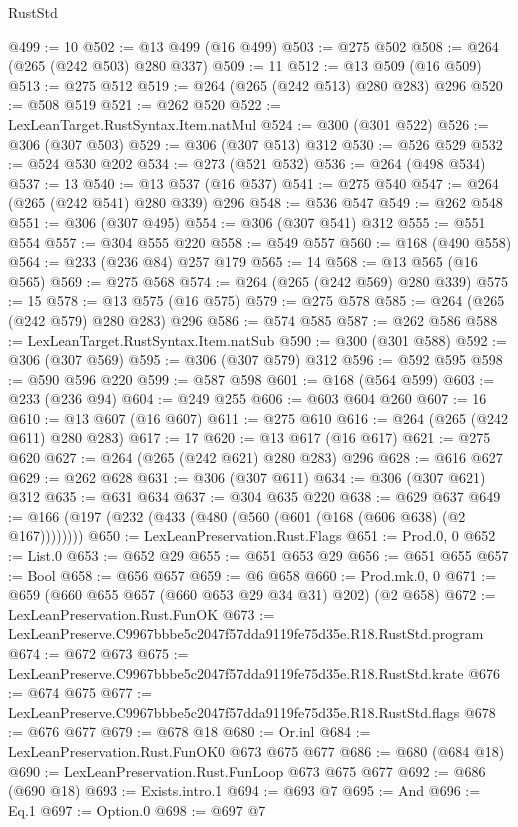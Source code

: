 \begin{lexlean}{RustStd}
\begin{coremodule}
@499 := 10
@502 := @13 @499 (@16 @499)
@503 := @275 @502
@508 := @264 (@265 (@242 @503) @280 @337)
@509 := 11
@512 := @13 @509 (@16 @509)
@513 := @275 @512
@519 := @264 (@265 (@242 @513) @280 @283) @296
@520 := @508 @519
@521 := @262 @520
@522 := LexLeanTarget.RustSyntax.Item.natMul
@524 := @300 (@301 @522)
@526 := @306 (@307 @503)
@529 := @306 (@307 @513) @312
@530 := @526 @529
@532 := @524 @530 @202
@534 := @273 (@521 @532)
@536 := @264 (@498 @534)
@537 := 13
@540 := @13 @537 (@16 @537)
@541 := @275 @540
@547 := @264 (@265 (@242 @541) @280 @339) @296
@548 := @536 @547
@549 := @262 @548
@551 := @306 (@307 @495)
@554 := @306 (@307 @541) @312
@555 := @551 @554
@557 := @304 @555 @220
@558 := @549 @557
@560 := @168 (@490 @558)
@564 := @233 (@236 @84) @257 @179
@565 := 14
@568 := @13 @565 (@16 @565)
@569 := @275 @568
@574 := @264 (@265 (@242 @569) @280 @339)
@575 := 15
@578 := @13 @575 (@16 @575)
@579 := @275 @578
@585 := @264 (@265 (@242 @579) @280 @283) @296
@586 := @574 @585
@587 := @262 @586
@588 := LexLeanTarget.RustSyntax.Item.natSub
@590 := @300 (@301 @588)
@592 := @306 (@307 @569)
@595 := @306 (@307 @579) @312
@596 := @592 @595
@598 := @590 @596 @220
@599 := @587 @598
@601 := @168 (@564 @599)
@603 := @233 (@236 @94)
@604 := @249 @255
@606 := @603 @604 @260
@607 := 16
@610 := @13 @607 (@16 @607)
@611 := @275 @610
@616 := @264 (@265 (@242 @611) @280 @283)
@617 := 17
@620 := @13 @617 (@16 @617)
@621 := @275 @620
@627 := @264 (@265 (@242 @621) @280 @283) @296
@628 := @616 @627
@629 := @262 @628
@631 := @306 (@307 @611)
@634 := @306 (@307 @621) @312
@635 := @631 @634
@637 := @304 @635 @220
@638 := @629 @637
@649 := @166 (@197 (@232 (@433 (@480 (@560 (@601 (@168 (@606 @638) (@2 @167))))))))
@650 := LexLeanPreservation.Rust.Flags
@651 := Prod.{0, 0}
@652 := List.{0}
@653 := @652 @29
@655 := @651 @653 @29
@656 := @651 @655
@657 := Bool
@658 := @656 @657
@659 := @6 @658
@660 := Prod.mk.{0, 0}
@671 := @659 (@660 @655 @657 (@660 @653 @29 @34 @31) @202) (@2 @658)
@672 := LexLeanPreservation.Rust.FunOK
@673 := LexLeanPreserve.C9967bbbe5c2047f57dda9119fe75d35e.R18.RustStd.program
@674 := @672 @673
@675 := LexLeanPreserve.C9967bbbe5c2047f57dda9119fe75d35e.R18.RustStd.krate
@676 := @674 @675
@677 := LexLeanPreserve.C9967bbbe5c2047f57dda9119fe75d35e.R18.RustStd.flags
@678 := @676 @677
@679 := @678 @18
@680 := Or.inl
@684 := LexLeanPreservation.Rust.FunOK0 @673 @675 @677
@686 := @680 (@684 @18)
@690 := LexLeanPreservation.Rust.FunLoop @673 @675 @677
@692 := @686 (@690 @18)
@693 := Exists.intro.{1}
@694 := @693 @7
@695 := And
@696 := Eq.{1}
@697 := Option.{0}
@698 := @697 @7

\end{coremodule}
\end{lexlean}
